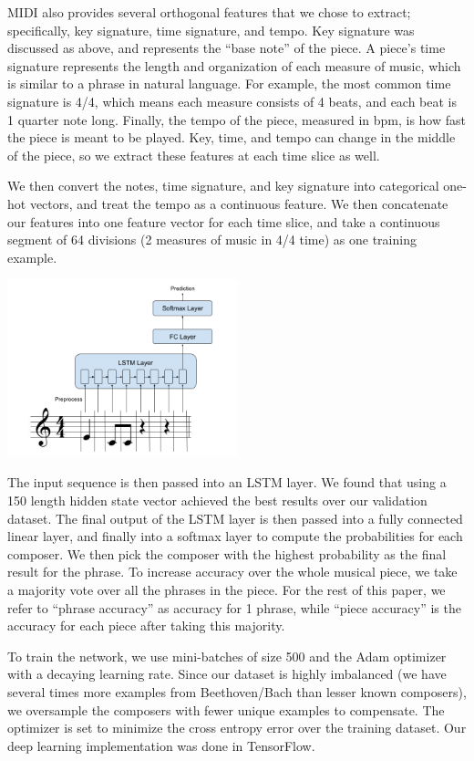 \documentclass[11pt,a4paper]{article}
\begin{document}
MIDI also provides several orthogonal features that we chose to extract; specifically, key signature, time signature, and tempo. Key signature was discussed as above, and represents the ``base note'' of the piece. A piece's time signature represents the length and organization of each measure of music, which is similar to a phrase in natural language. For example, the most common time signature is 4/4, which means each measure consists of 4 beats, and each beat is 1 quarter note long. Finally, the tempo of the piece, measured in bpm, is how fast the piece is meant to be played. Key, time, and tempo can change in the middle of the piece, so we extract these features at each time slice as well.

We then convert the notes, time signature, and key signature into categorical one-hot vectors, and treat the tempo as a continuous feature. We then concatenate our features into one feature vector for each time slice, and take a continuous segment of 64 divisions (2 measures of music in 4/4 time) as one training example.

\includegraphics[width=0.5\textwidth]{Architecture.png}

The input sequence is then passed into an LSTM layer. We found that using a 150 length hidden state vector achieved the best results over our validation dataset. The final output of the LSTM layer is then passed into a fully connected linear layer, and finally into a softmax layer to compute the probabilities for each composer. We then pick the composer with the highest probability as the final result for the phrase. To increase accuracy over the whole musical piece, we take a majority vote over all the phrases in the piece. For the rest of this paper, we refer to ``phrase accuracy'' as accuracy for 1 phrase, while ``piece accuracy'' is the accuracy for each piece after taking this majority. 	

To train the network, we use mini-batches of size 500 and the Adam optimizer with a decaying learning rate. Since our dataset is highly imbalanced (we have several times more examples from Beethoven/Bach than lesser known composers), we oversample the composers with fewer unique examples to compensate. The optimizer is set to minimize the cross entropy error over the training dataset. Our deep learning implementation was done in TensorFlow.
\end{document}
